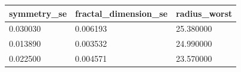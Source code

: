 \begin{tabular}{p{2.5cm}p{3cm}p{2.5cm}}
\toprule
symmetry\_se & fractal\_dimension\_se & radius\_worst \\
\midrule
0.030030 & 0.006193 & 25.380000 \\
0.013890 & 0.003532 & 24.990000 \\
0.022500 & 0.004571 & 23.570000 \\
\bottomrule
\end{tabular} 